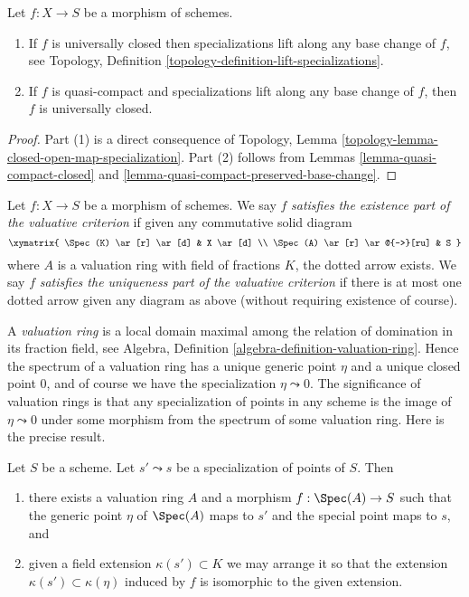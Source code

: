 \begin{lemma}
\label{lemma-specializations-lift}
Let $f : X \to S$ be a morphism of schemes.
\begin{enumerate}
\item If $f$ is universally closed then specializations lift
along any base change of $f$, see
Topology, Definition \ref{topology-definition-lift-specializations}.
\item If $f$ is quasi-compact and specializations lift
along any base change of $f$, then $f$ is universally closed.
\end{enumerate}
\end{lemma}

\begin{proof}
Part (1) is a direct consequence of
Topology, Lemma \ref{topology-lemma-closed-open-map-specialization}.
Part (2) follows from
Lemmas \ref{lemma-quasi-compact-closed} and
\ref{lemma-quasi-compact-preserved-base-change}.
\end{proof}

\begin{definition}
\label{definition-valuative-criterion}
Let $f : X \to S$ be a morphism of schemes. We say $f$
{\it satisfies the existence part of the valuative criterion}
if given any commutative solid diagram
$$
\xymatrix{
\Spec(K) \ar[r] \ar[d] & X \ar[d] \\
\Spec(A) \ar[r] \ar@{-->}[ru] & S
}
$$
where $A$ is a valuation ring with field of fractions $K$, the
dotted arrow exists. We say $f$ {\it satisfies the uniqueness
part of the valuative criterion} if there is at most one
dotted arrow given any diagram as above (without requiring
existence of course).
\end{definition}

\noindent
A {\it valuation ring} is a local domain maximal among the relation
of domination in its fraction field, see
Algebra, Definition \ref{algebra-definition-valuation-ring}.
Hence the spectrum of a valuation ring has a unique generic point
$\eta$ and a unique closed point $0$, and of course we have the
specialization $\eta \leadsto 0$.
The significance of valuation rings is that any specialization of
points in any scheme is the image of $\eta \leadsto 0$
under some morphism from the spectrum of some valuation ring.
Here is the precise result.

\begin{lemma}
\label{lemma-points-specialize}
Let $S$ be a scheme. Let $s' \leadsto s$ be a specialization of points of $S$.
Then
\begin{enumerate}
\item there exists a valuation ring $A$ and a morphism
$f : \Spec(A) \to S$ such that the generic point $\eta$ of
$\Spec(A)$ maps to $s'$ and the special point maps to $s$, and
\item given a field extension $\kappa(s') \subset K$
we may arrange it so that the extension
$\kappa(s') \subset \kappa(\eta)$ induced by $f$
is isomorphic to the given extension.
\end{enumerate}
\end{lemma}

